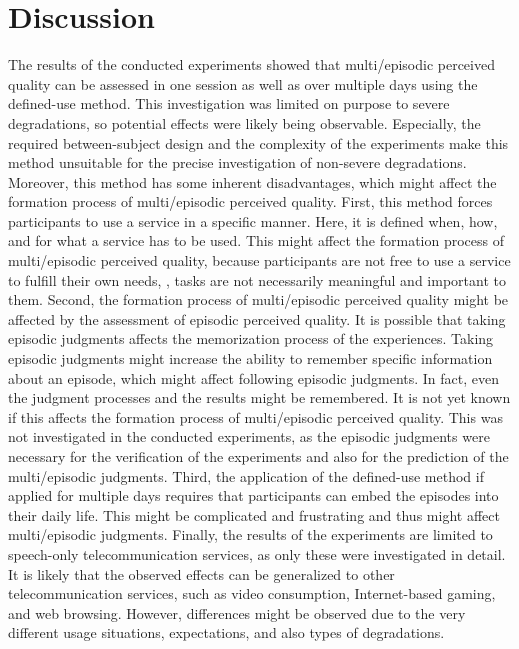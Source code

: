 \section{Discussion}
The results of the conducted experiments showed that multi\-/episodic perceived quality can be assessed in one session as well as over multiple days using the defined-use method.
This investigation was limited on purpose to severe degradations, so potential effects were likely being observable.
Especially, the required between-subject design and the complexity of the experiments make this method unsuitable for the precise investigation of non-severe degradations.
Moreover, this method has some inherent disadvantages, which might affect the formation process of multi\-/episodic perceived quality.
First, this method forces participants to use a service in a specific manner.
Here, it is defined when, how, and for what a service has to be used.
This might affect the formation process of  multi\-/episodic perceived quality, because participants are not free to use a service to fulfill their own needs, \ie, tasks are not necessarily meaningful and important to them.
Second, the formation process of multi\-/episodic perceived quality might be affected by the assessment of episodic perceived quality.
It is possible that taking episodic judgments affects the memorization process of the experiences.
Taking episodic judgments might increase the ability to remember specific information about an episode, which might affect following episodic judgments.
In fact, even the judgment processes and the results might be remembered.
It is not yet known if this affects the formation process of multi\-/episodic perceived quality.
This was not investigated in the conducted experiments, as the episodic judgments were necessary for the verification of the experiments and also for the prediction of the multi\-/episodic judgments.
Third, the application of the defined-use method if applied for multiple days requires that participants can embed the episodes into their daily life.
This might be complicated and frustrating and thus might affect multi\-/episodic judgments.
Finally, the results of the experiments are limited to speech-only telecommunication services, as only these were investigated in detail.
It is likely that the observed effects can be generalized to other telecommunication services, such as video consumption, Internet-based gaming, and web browsing.
However, differences might be observed due to the very different usage situations, expectations, and also types of degradations.


